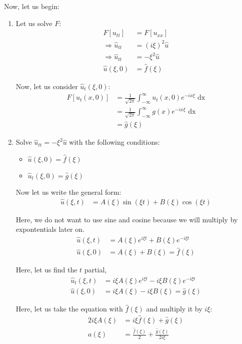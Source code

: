 Now, let us begin:
%
\begin{enumerate}
  \item Let us solve $F$:
  \begin{align}
    F[u_{tt}] & = F[u_{xx}]\\
    \Rightarrow \hat u_{tt} & = (i \xi)^2 \hat u\\
    \Rightarrow \hat u_{tt} & = - \xi^2 \hat u\\
    \hat u(\xi, 0) & = \hat f(\xi)
  \end{align}

  Now, let us consider $\hat u_t(\xi, 0)$:
  \begin{align}
    F[u_t(x, 0)] & = \frac{1}{\sqrt{2 \pi}} \int^\infty_{-\infty} u_t(x, 0) e^{-i x \xi} \text{ dx}\\
    & = \frac{1}{\sqrt{2 \pi}} \int^\infty_{-\infty} g(x) e^{-i x \xi} \text{ dx}\\
    & = \hat g(\xi)
  \end{align}

  \item Solve $\hat u_{tt} = -\xi^2 \hat u$ with the following conditions:
  \begin{itemize}
    \item $\hat u(\xi, 0) = \hat f(\xi)$
    \item $\hat u_t(\xi, 0) = \hat g(\xi)$
  \end{itemize}

  Now let us write the general form:
  \begin{align}
    \hat u(\xi, t) & = A(\xi) \sin(\xi t) + B(\xi) \cos(\xi t)
  \end{align}

  Here, we do not want to use sine and cosine because we will multiply by expontentials later on.
  \begin{align}
    \hat u(\xi, t) & = A(\xi) e^{i \xi t} + B(\xi) e^{-i \xi t}\\
    \hat u(\xi, 0) & = A(\xi) + B(\xi) = \hat f(\xi)
  \end{align}

  Here, let us find the $t$ partial,
  \begin{align}
    \hat u_t(\xi, t) & = i \xi A(\xi) e^{i \xi t} - i \xi B(\xi) e^{- i \xi t}\\
    \hat u (\xi, 0) & = i \xi A(\xi) - i \xi B(\xi) = \hat g(\xi)
  \end{align}

  Here, let us take the equation with $\hat f(\xi)$ and multiply it by $i \xi$:
  \begin{align}
    2 i \xi A(\xi) & = i \xi \hat f(\xi) + \hat g (\xi)\\
    a(\xi) & = \frac{\hat f(\xi)}{2} + \frac{\hat g(\xi)}{2 i \xi}
  \end{align}


\end{enumerate}
